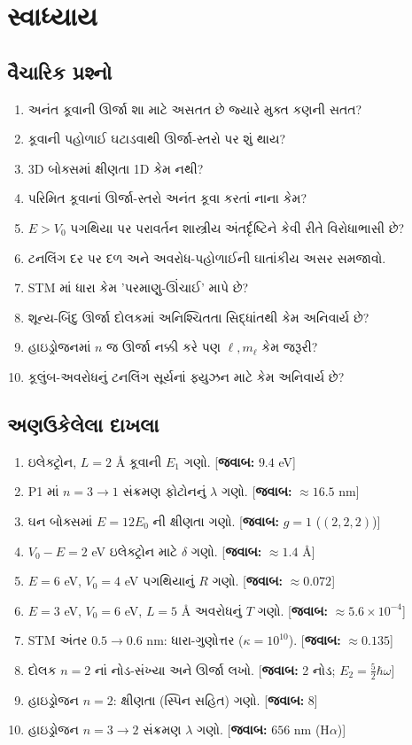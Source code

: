 \section{સ્વાધ્યાય}

\subsection{વૈચારિક પ્રશ્નો}
\begin{enumerate}[label=\textbf{Q\arabic*.}]
  \item અનંત કૂવાની ઊર્જા શા માટે અસતત છે જ્યારે મુક્ત કણની સતત?
  \item કૂવાની પહોળાઈ ઘટાડવાથી ઊર્જા-સ્તરો પર શું થાય?
  \item 3D બોક્સમાં ક્ષીણતા 1D કેમ નથી?
  \item પરિમિત કૂવાનાં ઊર્જા-સ્તરો અનંત કૂવા કરતાં નાના કેમ?
  \item $E>V_0$ પગથિયા પર પરાવર્તન શાસ્ત્રીય અંતર્દૃષ્ટિને કેવી રીતે વિરોધાભાસી છે?
  \item ટનલિંગ દર પર દળ અને અવરોધ-પહોળાઈની ઘાતાંકીય અસર સમજાવો.
  \item STM માં ધારા કેમ 'પરમાણુ-ઊંચાઈ' માપે છે?
  \item શૂન્ય-બિંદુ ઊર્જા દોલકમાં અનિશ્ચિતતા સિદ્ધાંતથી કેમ અનિવાર્ય છે?
  \item હાઇડ્રોજનમાં $n$ જ ઊર્જા નક્કી કરે પણ $\ell,m_\ell$ કેમ જરૂરી?
  \item કૂલુંબ-અવરોધનું ટનલિંગ સૂર્યનાં ફ્યુઝન માટે કેમ અનિવાર્ય છે?
\end{enumerate}

\subsection{અણઉકેલેલા દાખલા}
\begin{enumerate}[label=\textbf{P\arabic*.}]
  \item ઇલેક્ટ્રોન, $L=2$ Å કૂવાની $E_1$ ગણો. \hfill [\textbf{જવાબ:} $9.4$ eV]
  \item P1 માં $n=3\to1$ સંક્રમણ ફોટોનનું $\lambda$ ગણો. \hfill [\textbf{જવાબ:} $\approx16.5$ nm]
  \item ઘન બોક્સમાં $E=12E_0$ ની ક્ષીણતા ગણો. \hfill [\textbf{જવાબ:} $g=1$ ($(2,2,2)$)]
  \item $V_0-E=2$ eV ઇલેક્ટ્રોન માટે $\delta$ ગણો. \hfill [\textbf{જવાબ:} $\approx1.4$ Å]
  \item $E=6$ eV, $V_0=4$ eV પગથિયાનું $R$ ગણો. \hfill [\textbf{જવાબ:} $\approx0.072$]
  \item $E=3$ eV, $V_0=6$ eV, $L=5$ Å અવરોધનું $T$ ગણો. \hfill [\textbf{જવાબ:} $\approx5.6\times10^{-4}$]
  \item STM અંતર $0.5\to0.6$ nm: ધારા-ગુણોત્તર ($\kappa=10^{10}$). \hfill [\textbf{જવાબ:} $\approx0.135$]
  \item દોલક $n=2$ નાં નોડ-સંખ્યા અને ઊર્જા લખો. \hfill [\textbf{જવાબ:} 2 નોડ; $E_2=\tfrac52\hbar\omega$]
  \item હાઇડ્રોજન $n=2$: ક્ષીણતા (સ્પિન સહિત) ગણો. \hfill [\textbf{જવાબ:} $8$]
  \item હાઇડ્રોજન $n=3\to2$ સંક્રમણ $\lambda$ ગણો. \hfill [\textbf{જવાબ:} $656$ nm (H$\alpha$)]
\end{enumerate}

